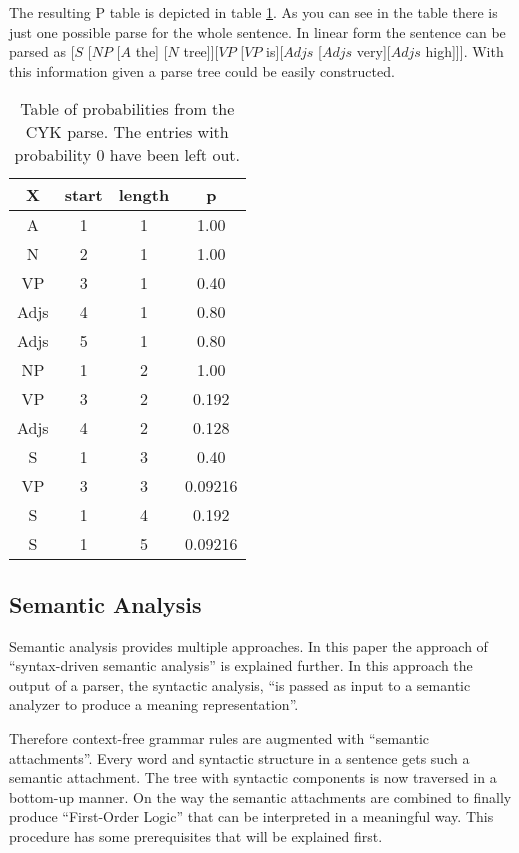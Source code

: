 \documentclass[12pt,twoside]{scrartcl}
\theoremstyle{plain}
\theoremstyle{definition}
\theoremstyle{remark}
\begin{document}
		The resulting P table is depicted in table \ref{tab:p}. As you can see in the table there is just one possible parse for the whole sentence. In linear form the sentence can be parsed as [$S$ [$NP$ [$A$ the] [$N$ tree]][$VP$ [$VP$ is][$Adjs$ [$Adjs$ very][$Adjs$ high]]]. With this information given a parse tree could be easily constructed.
		
		\begin{table}
			\caption{Table of probabilities from the CYK parse. The entries with probability 0 have been left out.}
			\label{tab:p}
			\centering
			\begin{tabular}{|c|c|c|c|}
				\hline
				X & start & length & p \\
				\hline
				A & 1 & 1 & 1.00 \\
				\hline
				N & 2 & 1 & 1.00 \\
				\hline				
				VP & 3 & 1 & 0.40 \\
				\hline
				Adjs & 4 & 1 & 0.80 \\
				\hline
				Adjs & 5 & 1 & 0.80 \\
				\hline
				NP & 1 & 2 & 1.00 \\
				\hline
				VP & 3 & 2 & 0.192 \\
				\hline
				Adjs & 4 & 2 & 0.128 \\
				\hline
				S & 1 & 3 & 0.40 \\
				\hline
				VP & 3 & 3 & 0.09216 \\
				\hline
				S & 1 & 4 & 0.192 \\
				\hline
				S & 1 & 5 & 0.09216 \\
				\hline
			\end{tabular}
		\end{table}
	\subsection{Semantic Analysis}
	\label{subSec:semanticAnalysis}
	
		Semantic analysis provides multiple approaches. In this paper the approach of ``syntax-driven semantic analysis''\cite[p.~617]{Jurafsky2009} is explained further. In this approach the output of a parser, the syntactic analysis, ``is passed as input to a semantic analyzer to produce a meaning representation''\cite[p.~618]{Jurafsky2009}.

		Therefore context-free grammar rules are augmented with ``semantic attachments''\cite[p.~618]{Jurafsky2009}. Every word and syntactic structure in a sentence gets such a semantic attachment. The tree with syntactic components is now traversed in a bottom-up manner. On the way the semantic attachments are combined to finally produce ``First-Order Logic''\cite[p.~589]{Jurafsky2009a} that can be interpreted in a meaningful way. This procedure has some prerequisites that will be explained first.
		
\end{document}
